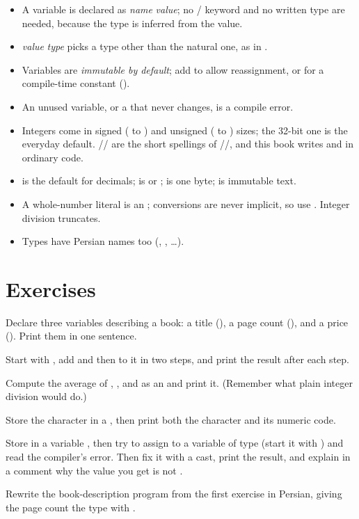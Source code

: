 \begin{itemize}[leftmargin=1.4em]
  \item A variable is declared as \textit{name} \code{:=} \textit{value}; no
        / keyword and no written type are needed, because
        the type is inferred from the value.
  \item \textit{value}  \textit{type} picks a type other than the
        natural one, as in .
  \item Variables are \emph{immutable by default}; add  to allow
        reassignment, or  for a compile-time constant
        ().
  \item An unused variable, or a  that never changes, is a compile
        error.
  \item Integers come in signed ( to ) and unsigned
        ( to ) sizes; the 32-bit one is the everyday default.
        // are the short spellings of
        //, and this book writes  and
         in ordinary code.
  \item {} is the default for decimals;  is  or
        ;  is one byte;  is immutable text.
  \item A whole-number literal is an ; conversions are never
        implicit, so use . Integer division truncates.
  \item Types have Persian names too (, ,
        \dots).
\end{itemize}

\section{Exercises}

\exercise Declare three variables describing a book: a title (), a page
count (), and a price (). Print them in one sentence.

\exercise Start with , add  and then 
to it in two steps, and print the result after each step.

\exercise Compute the average of , , and  as an
 and print it. (Remember what plain integer division would do.)

\exercise Store the character  in a , then print both the
character and its numeric code.

\exercise Store  in a variable , then try to assign  to a
 variable of type  (start it with ) and read the
compiler's error. Then fix it with a cast, print the result, and explain in a
comment why the value you get is not .

\exercise Rewrite the book-description program from the first exercise in
Persian, giving the page count the type  with
.
